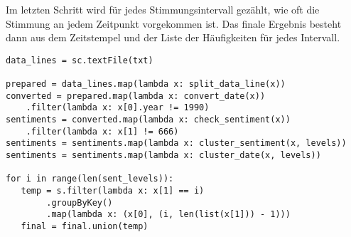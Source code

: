 Im letzten Schritt wird f\"ur jedes Stimmungsintervall gez\"ahlt, wie oft die Stimmung an jedem Zeitpunkt vorgekommen ist. Das finale Ergebnis besteht dann aus dem Zeitstempel und der Liste der H\"aufigkeiten f\"ur jedes Intervall.

\hrulefill
\begin{lstlisting}[caption={Spark Code}, label ={code:Spark}]
data_lines = sc.textFile(txt)

prepared = data_lines.map(lambda x: split_data_line(x))
converted = prepared.map(lambda x: convert_date(x))
	.filter(lambda x: x[0].year != 1990)
sentiments = converted.map(lambda x: check_sentiment(x))
	.filter(lambda x: x[1] != 666)
sentiments = sentiments.map(lambda x: cluster_sentiment(x, levels))
sentiments = sentiments.map(lambda x: cluster_date(x, levels))

for i in range(len(sent_levels)):
   temp = s.filter(lambda x: x[1] == i)
		.groupByKey()
		.map(lambda x: (x[0], (i, len(list(x[1])) - 1)))
   final = final.union(temp)

\end{lstlisting}
